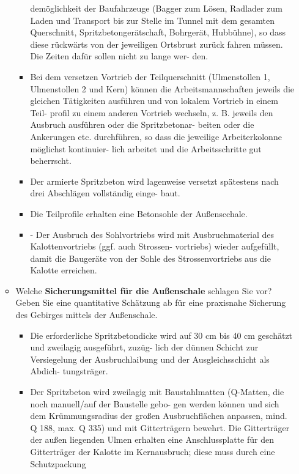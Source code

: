 \documentclass[fleqn,twoside]{article}
\begin{document}
\begin{small}
\begin{itemize}
\begin{itemize}[label={$\blacktriangleright$}]
\begin{itemize}[label={$\blacktriangleright$}]
        demöglichkeit der Baufahrzeuge (Bagger zum Lösen, Radlader zum Laden und Transport bis zur Stelle
        im Tunnel mit dem gesamten Querschnitt, Spritzbetongerätschaft, Bohrgerät, Hubbühne), so dass diese
        rückwärts von der jeweiligen Ortsbrust zurück fahren müssen. Die Zeiten dafür sollen nicht zu lange wer-
        den.
        \item Bei dem versetzen Vortrieb der Teilquerschnitt (Ulmenstollen 1, Ulmenstollen 2 und Kern) können die
        Arbeitsmannschaften jeweils die gleichen Tätigkeiten ausführen und von lokalem Vortrieb in einem Teil-
        profil zu einem anderen Vortrieb wechseln, z. B. jeweils den Ausbruch ausführen oder die Spritzbetonar-
        beiten oder die Ankerungen etc. durchführen, so dass die jeweilige Arbeiterkolonne möglichst kontinuier-
        lich arbeitet und die Arbeitsschritte gut beherrscht.
        \item Der armierte Spritzbeton wird lagenweise versetzt spätestens nach drei Abschlägen vollständig einge-
        baut.
        \item Die Teilprofile erhalten eine Betonsohle der Außenscchale.
        \item - Der Ausbruch des Sohlvortriebs wird mit Ausbruchmaterial des Kalottenvortriebs (ggf. auch Strossen-
        vortriebs) wieder aufgefüllt, damit die Baugeräte von der Sohle des Strossenvortriebs aus die Kalotte
        erreichen.
        \end{itemize}
        \item Welche \textbf{Sicherungsmittel für die Außenschale} schlagen Sie vor? Geben Sie eine quantitative Schätzung ab für eine praxisnahe Sicherung des Gebirges mittels der Außenschale.
        \begin{itemize}[label={$\blacktriangleright$}]
        \item Die erforderliche Spritzbetondicke wird auf 30 cm bis 40 cm geschätzt und zweilagig ausgeführt, zuzüg-
        lich der dünnen Schicht zur Versiegelung der Ausbruchlaibung und der Ausgleichsschicht als Abdich-
        tungsträger.
        \item Der Spritzbeton wird zweilagig mit Baustahlmatten (Q-Matten, die noch manuell/auf der Baustelle gebo-
        gen werden können und sich dem Krümmungsradius der großen Ausbruchflächen anpassen, mind. Q 188,
        max. Q 335) und mit Gitterträgern bewehrt. Die Gitterträger der außen liegenden Ulmen erhalten eine
        Anschlussplatte für den Gitterträger der Kalotte im Kernausbruch; diese muss durch eine Schutzpackung

\end{itemize}
\end{itemize}
\end{itemize}
\end{small}
\end{document}
